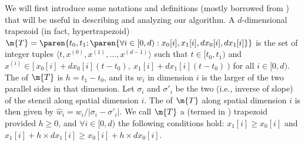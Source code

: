 

\begin{figure*}
\centering
{}
%
\vspace{-0.3cm}
\caption{$1$D Divide-and-conquer, 
  both in spatial dimension ( \& ) and 
  time dimension ().}
\label{fig:SeqCut}
\end{figure*}

We will first introduce some notations and definitions
(mostly borrowed from \cite{FrigoSt05,FrigoSt09}) that
will be useful in describing and analyzing our algorithm.
%
A $d$-dimensional trapezoid (in fact, hypertrapezoid) $\m{T} = \paren{t_0, t_1; 
\paren{\forall{i \in [0, d)}: x_{0}[ i ], x_{1}[ i ],
dx_{0}[ i ], dx_{1}[ i ] }}$ is the set of integer tuples
$\langle t, x^{(0)}, x^{(1)}, \ldots, x^{(d - 1)}\rangle$
such that $t \in [t_0, t_1)$ and $x^{(i)} \in [~x_0[ i ] + dx_{0}[ i ](t - t_0),~ 
x_1[ i ] + dx_{1}[ i ](t - t_0)~)$ for all $i \in [0, d)$. 
%
The  of $\m{T}$ is $h = t_1 - t_0$, and its
 $w_i$ in dimension $i$ is the larger
 of
the two parallel sides in that dimension.
Let $\sigma_i$ and ${\sigma'}_i$ be the two
 (i.e., inverse of slope) of the stencil
along spatial dimension $i$. The 
of $\m{T}$ along spatial dimension $i$ is then given by 
${\widehat{w}}_i = { w_i / { | {\sigma}_i - {\sigma'}_i | } }$.
%
We call $\m{T}$ a  (termed 
in \cite{FrigoSt05,FrigoSt09}) trapezoid
provided $h \geq 0$, and $\forall{i \in [ 0, d )}$
the following conditions hold: $x_1[i] \geq x_0[i]$
and $x_1[i] + h \times dx_1[i] \geq x_0[i] + h \times dx_0[i]$.
%


